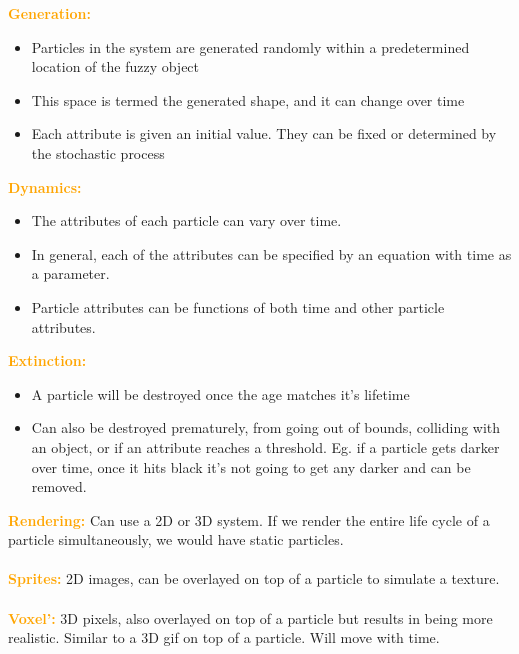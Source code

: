 \documentclass[a4paper,10pt]{article}
\begin{document}
\textcolor{Orange}{\textbf{Generation:}} 
\renewcommand{\labelitemi}{\textperiodcentered}
\begin{itemize}
\item Particles in the system are generated randomly within a predetermined location of the fuzzy object 
\item This space is termed the generated shape, and it can change over time 
\item Each attribute is given an initial value. They can be fixed or determined by the stochastic process
\end{itemize}
\textcolor{Orange}{\textbf{Dynamics:}}
\renewcommand{\labelitemi}{\textperiodcentered}
\begin{itemize}
\item The attributes of each particle can vary over time. 
\item In general, each of the attributes can be specified by an equation with time as a parameter. 
\item Particle attributes can be functions of both time and other particle attributes. 
\end{itemize}
\textcolor{Orange}{\textbf{Extinction:}}
\renewcommand{\labelitemi}{\textperiodcentered}
\begin{itemize}
\item A particle will be destroyed once the age matches it's lifetime
\item Can also be destroyed prematurely, from going out of bounds, colliding with an object, or if an attribute reaches a threshold. Eg. if a particle gets darker over time, once it hits black it's not going to get any darker and can be removed. 
\end{itemize}
\textcolor{Orange}{\textbf{Rendering:}} Can use a 2D or 3D system. If we render the entire life cycle of a particle simultaneously, we would have static particles. \\\\
\textcolor{Orange}{\textbf{Sprites:}} 2D images, can be overlayed on top of a particle to simulate a texture. \\\\
\textcolor{Orange}{\textbf{Voxel':}} 3D pixels, also overlayed on top of a particle but results in being more realistic. Similar to a 3D gif on top of a particle. Will move with time.  \\\\
\textcolor{Orange}{\textbf{}} \\\\
\end{document}

